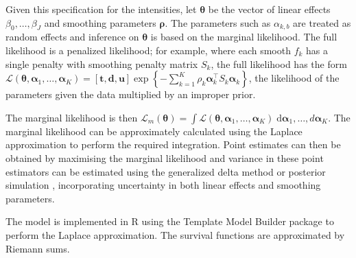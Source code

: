 \documentclass[referee]{rgclass}
\begin{document}
Given this specification for the intensities, let $\bm\theta$ be the vector of linear effects $\beta_0, \ldots, \beta_J$ and smoothing parameters $\bm\rho$.  The parameters such as $\alpha_{k, b}$ are treated as random effects and inference on $\bm\theta$ is based on the marginal likelihood. The full likelihood is a penalized likelihood; for example, where each smooth $f_k$ has a single penalty with smoothing penalty matrix $S_k$, the full likelihood has the form $\mathcal{L}(\bm\theta, \bm\alpha_1, \ldots, \bm\alpha_K) = [\bm{t}, \bm{d}, \bm{u}]\exp\left\{-\sum_{k = 1}^K \rho_k\bm\alpha_k^\intercal S_k \bm\alpha_k\right\}$, the likelihood of the parameters given the data multiplied by an improper prior. 

The marginal likelihood is then $\mathcal{L}_m(\bm\theta) = \int \mathcal{L}(\bm\theta, \bm\alpha_1, \ldots, \bm\alpha_K) \;\mathrm{d}\bm\alpha_1, \ldots,d\bm\alpha_K$. The marginal likelihood can be approximately calculated using the Laplace approximation to perform the required integration. Point estimates can then be obtained by maximising the marginal likelihood and variance in these point estimators can be estimated using the generalized delta method or posterior simulation \citep{wood2016smoothing, wood2017generalized}, incorporating uncertainty in both linear effects and smoothing parameters. 

The model is implemented in R \citep{R} using the Template Model Builder package \citep{TMB} to perform the Laplace approximation. The survival functions are approximated by Riemann sums. 
 



\end{document}
